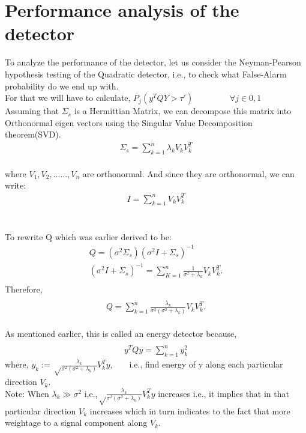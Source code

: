 \documentclass[a4paper,english,12pt]{article}
\begin{document}
 \section{Performance analysis of the detector}
 To analyze the performance of the detector, let us consider the Neyman-Pearson hypothesis testing of the Quadratic detector, i.e., to check what False-Alarm probability do we end up with.
 \\For that we will have to calculate, $P_j(y^TQY>\tau')$  \ \ \ \ \ \ \ \ $\forall j \in{0,1}$
 \\ Assuming that $\Sigma_s$ is a Hermittian Matrix, we can decompose this matrix into Orthonormal eigen vectors using the Singular Value Decomposition theorem(SVD). 
 \begin{align*}
 \Sigma_s = \sum_{k=1}^{n}\lambda_kV_kV_k^T
 \end{align*}
 \\ where $V_1, V_2,......,V_n$ are orthonormal. And since they are orthonormal, we can write:\\
 \begin{align*}
 I=\sum_{k=1}^{n}V_kV_k^T
 \end{align*}\\
 \\To rewrite Q which was earlier derived to be:\\
 \begin{align*}
 Q=(\sigma^{2}\Sigma_s)(\sigma^{2}I+\Sigma_s)^{-1}\\
 (\sigma^{2}I+\Sigma_s)^{-1}=\sum_{K=1}^{n}\frac{1}{\sigma^2+\lambda_k}V_kV_k^T.\\
 \end{align*}
 Therefore,
 \begin{align*}
 \\Q=\sum_{k=1}^{n}\frac{\lambda_k}{\sigma^2(\sigma^2+\lambda_k)}V_kV_k^T.
 \end{align*}
 \\As mentioned earlier, this is called an energy detector because,
 \begin{align*}
 \\y^{T}Qy=\sum_{k=1}^{n}y_k^{2}
 \end{align*}
 where, $y_k:=\sqrt\frac{\lambda_k}{\sigma^2(\sigma^2+\lambda_k)}V_k^Ty$,\ \ \ \ i.e., find energy of y along each particular direction $V_k$.\\
 Note: When $\lambda_k\gg\sigma^2$ i,e.,$\sqrt\frac{\lambda_k}{\sigma^2(\sigma^2+\lambda_k)}V_k^Ty$ increases i.e., it implies that in that particular direction $V_k$ increases which in turn indicates to the fact that more weightage to a signal component along $V_k$. \\
\end{document}
